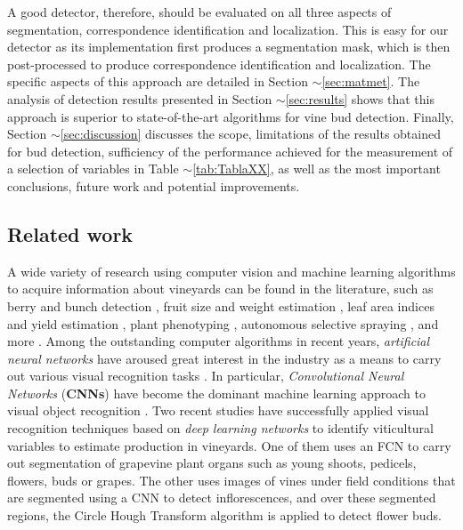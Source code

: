 \documentclass[a4paper,authoryear,review]{elsarticle}
\begin{document}
A good detector, therefore, should be evaluated on all three aspects of segmentation, correspondence identification and localization. This is easy for our detector as its implementation first produces a segmentation mask, which is then post-processed to produce correspondence identification and localization. The specific aspects of this approach are detailed in Section $\sim$\ref{sec:matmet}. The analysis of detection results presented in Section $\sim$\ref{sec:results} shows that this approach is superior to state-of-the-art algorithms for vine bud detection. Finally, Section $\sim$\ref{sec:discussion} discusses the scope, limitations of the results obtained for bud detection, sufficiency of the performance achieved for the measurement of a selection of variables in Table $\sim$\ref{tab:TablaXX}, as well as the most important conclusions, future work and potential improvements.

\subsection{Related work}
\label{sec:related}
A wide variety of research using computer vision and machine learning algorithms to acquire information about vineyards \citep{seng2018computer} can be found in the literature, such as berry and bunch detection \citep{nuske2011yield}, fruit size and weight estimation \citep{tardaguila2012automatic}, leaf area indices and yield estimation \citep{diago2012grapevine}, plant phenotyping \citep{herzog2014objective, herzog2014initial}, autonomous selective spraying \citep{berenstein2010grape}, and more \citep{tardaguila2012applications, whalley2013applications}. Among the outstanding computer algorithms in recent years, \emph{artificial neural networks} have aroused great interest in the industry as a means to carry out various visual recognition tasks \citep{hirano2006industry, kahng2017cti, tilgner2019multi}. In particular, \emph{Convolutional Neural Networks} (\textbf{CNNs}) have become the dominant machine learning approach to visual object recognition \citep{ning2017inception}. Two recent studies have successfully applied visual recognition techniques based on \emph{deep learning networks} to identify viticultural variables to estimate production in vineyards. One of them \citet{grimm2019adaptable} uses an FCN to carry out segmentation of grapevine plant organs such as young shoots, pedicels, flowers, buds or grapes. The other \citet{rudolph2018efficient} uses images of vines under field conditions that are segmented using a CNN to detect inflorescences, and over these segmented regions, the Circle Hough Transform algorithm is applied to detect flower buds.
\end{document}
